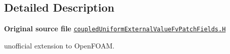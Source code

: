 \subsection{Detailed Description}
{\bfseries Original source file} \href{../../../home/carlo/data/GeN-Foam/GeN-Foam_ffn/GeN-Foam/GeN-Foam/FMU4FOAM/ECI4FOAM/src/externalComm/externalIO/input/BC/coupledUniformExternalValue/coupledUniformExternalValueFvPatchFields.H}{\tt coupled\+Uniform\+External\+Value\+Fv\+Patch\+Fields.\+H}

\begin{DoxyVerb}unofficial extension to OpenFOAM.\end{DoxyVerb}
